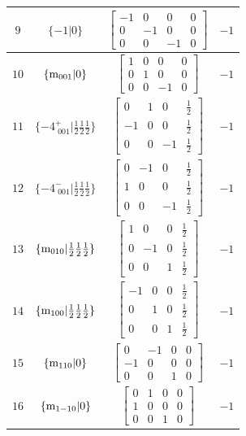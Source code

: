 \documentclass[fleqn,8pt]{jsarticle}
\begin{document}
\begin{longtable}{cccc}
$ 9 $ & $ \{-1|0\} $ & $ \begin{bmatrix} -1 & 0 & 0 & 0 \\ 0 & -1 & 0 & 0 \\ 0 & 0 & -1 & 0 \end{bmatrix} $ & $ -1 $ \\ \hline
$ 10 $ & $ \{{\rm m}_{001}|0\} $ & $ \begin{bmatrix} 1 & 0 & 0 & 0 \\ 0 & 1 & 0 & 0 \\ 0 & 0 & -1 & 0 \end{bmatrix} $ & $ -1 $ \\ \hline
$ 11 $ & $ \{-4^{+}_{\,\,001}|\frac{1}{2} \frac{1}{2} \frac{1}{2}\} $ & $ \begin{bmatrix} 0 & 1 & 0 & \frac{1}{2} \\ -1 & 0 & 0 & \frac{1}{2} \\ 0 & 0 & -1 & \frac{1}{2} \end{bmatrix} $ & $ -1 $ \\ \hline
$ 12 $ & $ \{-4^{-}_{\,\,001}|\frac{1}{2} \frac{1}{2} \frac{1}{2}\} $ & $ \begin{bmatrix} 0 & -1 & 0 & \frac{1}{2} \\ 1 & 0 & 0 & \frac{1}{2} \\ 0 & 0 & -1 & \frac{1}{2} \end{bmatrix} $ & $ -1 $ \\ \hline
$ 13 $ & $ \{{\rm m}_{010}|\frac{1}{2} \frac{1}{2} \frac{1}{2}\} $ & $ \begin{bmatrix} 1 & 0 & 0 & \frac{1}{2} \\ 0 & -1 & 0 & \frac{1}{2} \\ 0 & 0 & 1 & \frac{1}{2} \end{bmatrix} $ & $ -1 $ \\ \hline
$ 14 $ & $ \{{\rm m}_{100}|\frac{1}{2} \frac{1}{2} \frac{1}{2}\} $ & $ \begin{bmatrix} -1 & 0 & 0 & \frac{1}{2} \\ 0 & 1 & 0 & \frac{1}{2} \\ 0 & 0 & 1 & \frac{1}{2} \end{bmatrix} $ & $ -1 $ \\ \hline
$ 15 $ & $ \{{\rm m}_{110}|0\} $ & $ \begin{bmatrix} 0 & -1 & 0 & 0 \\ -1 & 0 & 0 & 0 \\ 0 & 0 & 1 & 0 \end{bmatrix} $ & $ -1 $ \\ \hline
$ 16 $ & $ \{{\rm m}_{1-10}|0\} $ & $ \begin{bmatrix} 0 & 1 & 0 & 0 \\ 1 & 0 & 0 & 0 \\ 0 & 0 & 1 & 0 \end{bmatrix} $ & $ -1 $ \\
\end{longtable}
\end{document}
